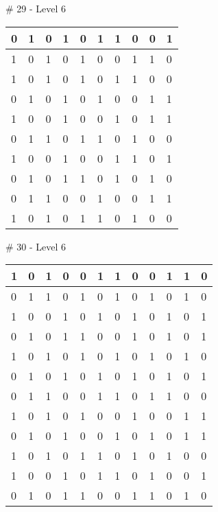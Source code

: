 \# 29 - Level 6 \newline
\begin{tabular}{|m{\collen}|m{\collen}|m{\collen}|m{\collen}|m{\collen}|m{\collen}|m{\collen}|m{\collen}|m{\collen}|m{\collen}|}
\hline
  0 & 1 & 0 & 1 & 0 & 1 & 1 & 0 & 0 & 1 \\
\hline
  1 & 0 & 1 & 0 & 1 & 0 & 0 & 1 & 1 & 0 \\
\hline
  1 & 0 & 1 & 0 & 1 & 0 & 1 & 1 & 0 & 0 \\
\hline
  0 & 1 & 0 & 1 & 0 & 1 & 0 & 0 & 1 & 1 \\
\hline
  1 & 0 & 0 & 1 & 0 & 0 & 1 & 0 & 1 & 1 \\
\hline
  0 & 1 & 1 & 0 & 1 & 1 & 0 & 1 & 0 & 0 \\
\hline
  1 & 0 & 0 & 1 & 0 & 0 & 1 & 1 & 0 & 1 \\
\hline
  0 & 1 & 0 & 1 & 1 & 0 & 1 & 0 & 1 & 0 \\
\hline
  0 & 1 & 1 & 0 & 0 & 1 & 0 & 0 & 1 & 1 \\
\hline
  1 & 0 & 1 & 0 & 1 & 1 & 0 & 1 & 0 & 0 \\
\hline
\end{tabular}


\smallskip

\# 30 - Level 6 \newline
\begin{tabular}{|m{\collen}|m{\collen}|m{\collen}|m{\collen}|m{\collen}|m{\collen}|m{\collen}|m{\collen}|m{\collen}|m{\collen}|m{\collen}|m{\collen}|}
\hline
  1 & 0 & 1 & 0 & 0 & 1 & 1 & 0 & 0 & 1 & 1 & 0 \\
\hline
  0 & 1 & 1 & 0 & 1 & 0 & 1 & 0 & 1 & 0 & 1 & 0 \\
\hline
  1 & 0 & 0 & 1 & 0 & 1 & 0 & 1 & 0 & 1 & 0 & 1 \\
\hline
  0 & 1 & 0 & 1 & 1 & 0 & 0 & 1 & 0 & 1 & 0 & 1 \\
\hline
  1 & 0 & 1 & 0 & 1 & 0 & 1 & 0 & 1 & 0 & 1 & 0 \\
\hline
  0 & 1 & 0 & 1 & 0 & 1 & 0 & 1 & 0 & 1 & 0 & 1 \\
\hline
  0 & 1 & 1 & 0 & 0 & 1 & 1 & 0 & 1 & 1 & 0 & 0 \\
\hline
  1 & 0 & 1 & 0 & 1 & 0 & 0 & 1 & 0 & 0 & 1 & 1 \\
\hline
  0 & 1 & 0 & 1 & 0 & 0 & 1 & 0 & 1 & 0 & 1 & 1 \\
\hline
  1 & 0 & 1 & 0 & 1 & 1 & 0 & 1 & 0 & 1 & 0 & 0 \\
\hline
  1 & 0 & 0 & 1 & 0 & 1 & 1 & 0 & 1 & 0 & 0 & 1 \\
\hline
  0 & 1 & 0 & 1 & 1 & 0 & 0 & 1 & 1 & 0 & 1 & 0 \\
\hline
\end{tabular}


